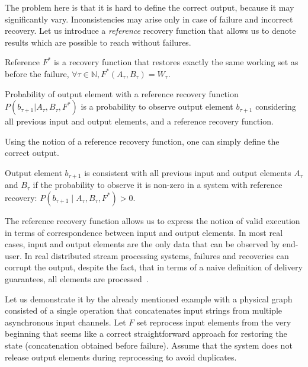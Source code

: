 The problem here is that it is hard to define the correct output, because it may significantly vary. Inconsistencies may arise only in case of failure and incorrect recovery. Let us introduce a {\em reference} recovery function that allows us to denote results which are possible to reach without failures.

\begin{definition}{Reference}
$F^{*}$ is a recovery function that restores exactly the same working set as before the failure, $\forall \tau \in \mathbb{N}, F^{*}(A_\tau,B_\tau)=W_\tau$.
\end{definition}

\begin{definition}{Probability of output element with a reference recovery function}
$P(b_{\tau+1}|A_{\tau}, B_\tau, F^{*})$ is a probability to observe output element $b_{\tau+1}$ considering all previous input and output elements, and a reference recovery function.
\end{definition}

Using the notion of a reference recovery function, one can simply define the correct output. 

\begin{definition}{Output element $b_{\tau+1}$ is consistent}
with all previous input and output elements $A_\tau$ and $B_\tau$ if the probability to observe it is non-zero in a system with reference recovery: $P(b_{\tau+1} \mid A_\tau,B_\tau,F^{*})>0$.
\end{definition}

The reference recovery function allows us to express the notion of valid execution in terms of correspondence between input and output elements. In most real cases, input and output elements are the only data that can be observed by end-user. In real distributed stream processing systems, failures and recoveries can corrupt the output, despite the fact, that in terms of a naive definition of delivery guarantees, all elements are processed~\eo. 

Let us demonstrate it by the already mentioned example with a physical graph consisted of a single operation that concatenates input strings from multiple asynchronous input channels. Let $F$ set reprocess input elements from the very beginning that seems like a correct straightforward approach for restoring the state (concatenation obtained before failure). Assume that the system does not release output elements during reprocessing to avoid duplicates. 

